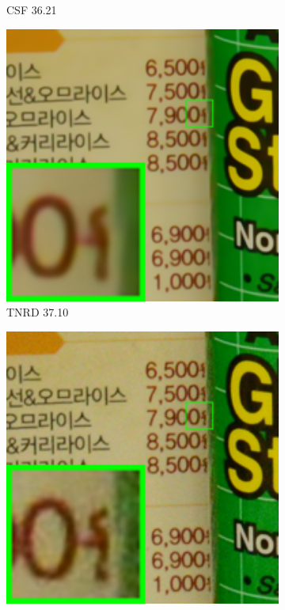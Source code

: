 \begin{figure}
\begin{subfigure}[t]{0.19\textwidth}
\caption{CSF 36.21}
    \end{subfigure}
    \hfill
    \begin{subfigure}[t]{0.19\textwidth}
        \centering
        \includegraphics[width=1\textwidth]{images/guided/resize_br_TRD_CC_Noisy_Nikon_D800_ISO_3200_A3_96.png}
\caption{TNRD 37.10}
    \end{subfigure}
\hfill
    \begin{subfigure}[t]{0.19\textwidth}
        \centering
        \includegraphics[width=1\textwidth]{images/guided/resize_br_DnCNN_CC_Noisy_Nikon_D800_ISO_3200_A3_96.png}

\end{subfigure}
\end{figure}
